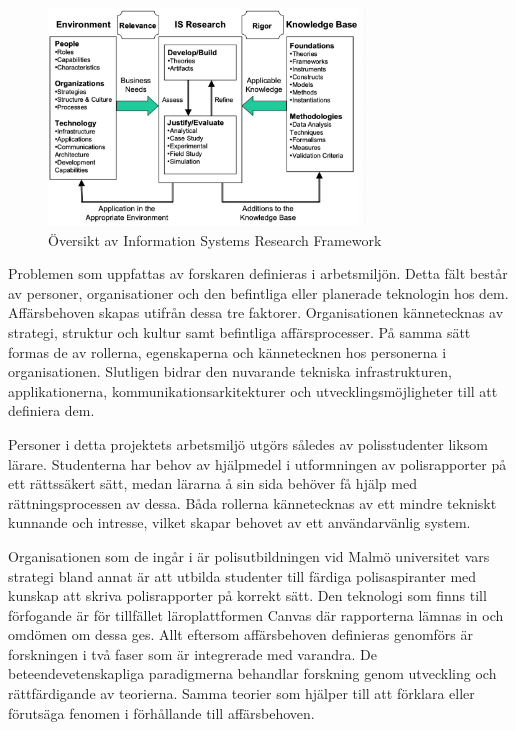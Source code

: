 \documentclass[swedish]{maucsthesis}
\begin{document}
\begin{figure}[H]
    \centering
    \includegraphics[width=0.75\textwidth]{isframework}
    \caption{Översikt av Information Systems Research Framework}
    \label{fig:isframework}
\end{figure}

Problemen som uppfattas av forskaren definieras i arbetsmiljön. Detta fält
består av personer, organisationer och den befintliga eller planerade teknologin
hos dem. Affärsbehoven skapas utifrån dessa tre faktorer. Organisationen
kännetecknas av strategi, struktur och kultur samt befintliga affärsprocesser.
På samma sätt formas de av rollerna, egenskaperna och kännetecknen hos
personerna i organisationen. Slutligen bidrar den nuvarande tekniska
infrastrukturen, applikationerna, kommunikationsarkitekturer och
utvecklingsmöjligheter till att definiera dem.

Personer i detta projektets arbetsmiljö utgörs således av polisstudenter liksom
lärare. Studenterna har behov av hjälpmedel i utformningen av polisrapporter på
ett rättssäkert sätt, medan lärarna å sin sida behöver få hjälp med
rättningsprocessen av dessa. Båda rollerna kännetecknas av ett mindre tekniskt
kunnande och intresse, vilket skapar behovet av ett användarvänlig system.

Organisationen som de ingår i är polisutbildningen vid Malmö universitet vars
strategi bland annat är att utbilda studenter till färdiga polisaspiranter med
kunskap att skriva polisrapporter på korrekt sätt. Den teknologi som finns till
förfogande är för tillfället läroplattformen Canvas där rapporterna lämnas in
och omdömen om dessa ges. Allt eftersom affärsbehoven definieras genomförs är
forskningen i två faser som är integrerade med varandra. De
beteendevetenskapliga paradigmerna behandlar forskning genom utveckling och
rättfärdigande av teorierna. Samma teorier som hjälper till att förklara eller
förutsäga fenomen i förhållande till affärsbehoven.
\end{document}
